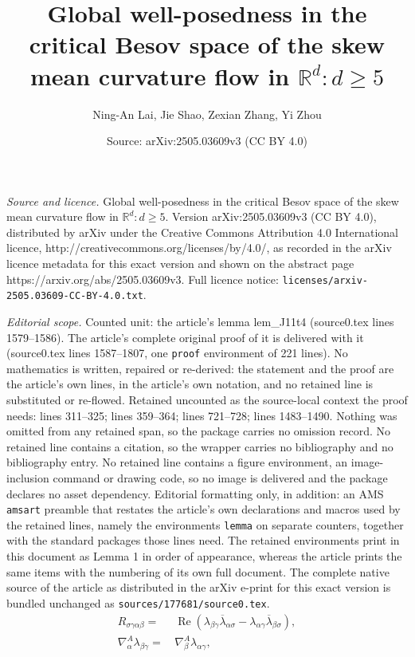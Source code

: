 \documentclass[10pt,a4paper]{amsart}
\title{Global well-posedness in the critical Besov space of the skew mean curvature flow in $\mathbb{R}^d: d\ge 5$}
\author{Ning-An Lai, Jie Shao, Zexian Zhang, Yi Zhou}
\date{Source: arXiv:2505.03609v3 (CC BY 4.0)}
\begin{document}
\maketitle

\noindent\emph{Source and licence.} Global well-posedness in the critical Besov space of the skew mean curvature flow in $\mathbb{R}^d: d\ge 5$. Version arXiv:2505.03609v3 (CC BY 4.0), distributed by arXiv under the Creative Commons Attribution 4.0 International licence, http://creativecommons.org/licenses/by/4.0/, as recorded in the arXiv licence metadata for this exact version and shown on the abstract page https://arxiv.org/abs/2505.03609v3. Full licence notice: \texttt{licenses/arxiv-2505.03609-CC-BY-4.0.txt}.\par\smallskip

\noindent\textit{Editorial scope.} Counted unit: the article's lemma lem\_J11t4 (source0.tex lines 1579--1586). The article's complete original proof of it is delivered with it (source0.tex lines 1587--1807, one \texttt{proof} environment of 221 lines). No mathematics is written, repaired or re-derived: the statement and the proof are the article's own lines, in the article's own notation, and no retained line is substituted or re-flowed.  Retained uncounted as the source-local context the proof needs: lines 311--325; lines 359--364; lines 721--728; lines 1483--1490.  Nothing was omitted from any retained span, so the package carries no omission record.  No retained line contains a citation, so the wrapper carries no bibliography and no bibliography entry.  No retained line contains a figure environment, an image-inclusion command or drawing code, so no image is delivered and the package declares no asset dependency.  Editorial formatting only, in addition: an AMS \texttt{amsart} preamble that restates the article's own declarations and macros used by the retained lines, namely the environments \texttt{lemma} on separate counters, together with the standard packages those lines need.  The retained environments print in this document as Lemma 1 in order of appearance, whereas the article prints the same items with the numbering of its own full document.  The complete native source of the article as distributed in the arXiv e-print for this exact version is bundled unchanged as \texttt{sources/177681/source0.tex}.
\begin{align}
R_{\sigma\gamma\alpha\beta}
=&\,
\operatorname{Re}
\left(
\lambda_{\beta\gamma}\overline{\lambda}_{\alpha\sigma}
-
\lambda_{\alpha\gamma}\overline{\lambda}_{\beta\sigma}
\right),
\label{eq:gauss-complex}\\
\nabla_\alpha^A\lambda_{\beta\gamma}
=&\,
\nabla_\beta^A\lambda_{\alpha\gamma},
\label{eq:codazzi-complex}
\end{align}
\end{document}
